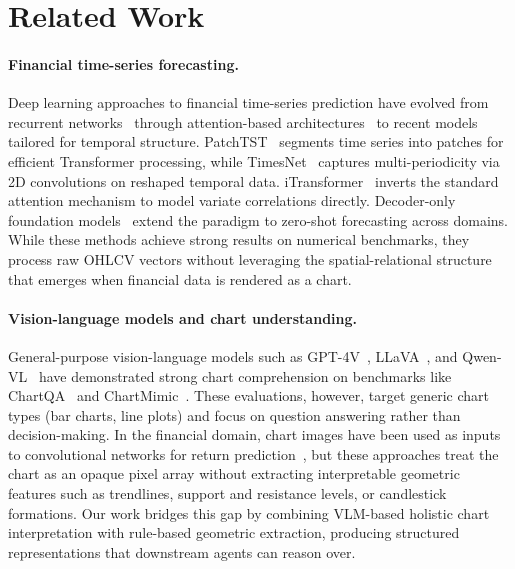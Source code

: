 \section{Related Work}
\label{sec:related}

\paragraph{Financial time-series forecasting.}
Deep learning approaches to financial time-series prediction have evolved from recurrent networks~\cite{hochreiter1997lstm} through attention-based architectures~\cite{vaswani2017attention} to recent models tailored for temporal structure. PatchTST~\cite{nie2023patchtst} segments time series into patches for efficient Transformer processing, while TimesNet~\cite{wu2023timesnet} captures multi-periodicity via 2D convolutions on reshaped temporal data. iTransformer~\cite{liu2024itransformer} inverts the standard attention mechanism to model variate correlations directly. Decoder-only foundation models~\cite{das2024decoder} extend the paradigm to zero-shot forecasting across domains. While these methods achieve strong results on numerical benchmarks, they process raw OHLCV vectors without leveraging the spatial-relational structure that emerges when financial data is rendered as a chart.

\paragraph{Vision-language models and chart understanding.}
General-purpose vision-language models such as GPT-4V~\cite{openai2023gpt4v}, LLaVA~\cite{liu2024llava}, and Qwen-VL~\cite{bai2023qwenvl} have demonstrated strong chart comprehension on benchmarks like ChartQA~\cite{masry2022chartqa} and ChartMimic~\cite{chen2024chartmimic}. These evaluations, however, target generic chart types (bar charts, line plots) and focus on question answering rather than decision-making. In the financial domain, chart images have been used as inputs to convolutional networks for return prediction~\cite{jiang2023cnncharts,chen2021deeplearningcharts}, but these approaches treat the chart as an opaque pixel array without extracting interpretable geometric features such as trendlines, support and resistance levels, or candlestick formations. Our work bridges this gap by combining VLM-based holistic chart interpretation with rule-based geometric extraction, producing structured representations that downstream agents can reason over.

